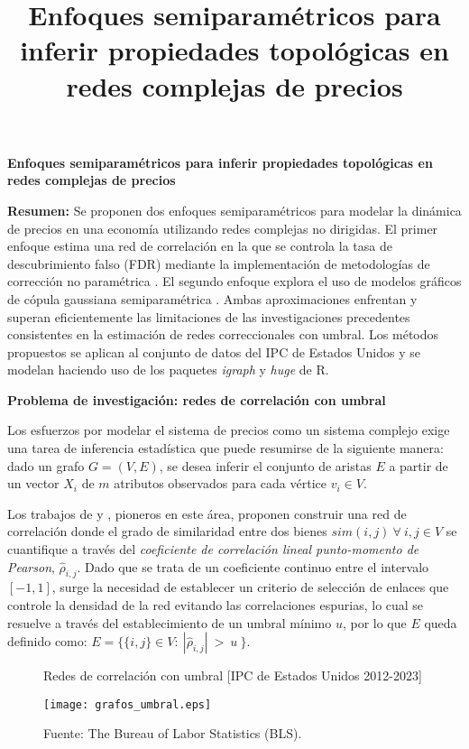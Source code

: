 \documentclass[11pt]{article}
\title{Enfoques semiparamétricos para inferir propiedades topológicas en redes complejas de precios}
\date{}
\begin{document}
\Large \textbf{Enfoques semiparamétricos para inferir propiedades topológicas en redes complejas de precios} \vspace{5mm}

\begin{spacing}{0.9}
{\small \textbf{Resumen:}
	Se proponen dos enfoques semiparamétricos para modelar la dinámica de precios en una economía utilizando redes complejas no dirigidas. El primer enfoque estima una red de correlación en la que se controla la tasa de descubrimiento falso (FDR) mediante la implementación de metodologías de corrección no paramétrica \citep{kolaczyk2014statistical}. El segundo enfoque explora el uso de modelos gráficos de cópula gaussiana semiparamétrica \citep{liu2012high}. Ambas aproximaciones enfrentan y superan eficientemente las limitaciones de las investigaciones precedentes consistentes en la estimación de redes correccionales con umbral. Los métodos propuestos se aplican al conjunto de datos del IPC de Estados Unidos y se modelan haciendo uso de los paquetes \textit{igraph} y \textit{huge} de R.} \vspace{5mm}
\end{spacing}
	
\large \textbf{Problema de investigación: redes de correlación con umbral} 

	Los esfuerzos por modelar el sistema de precios como un sistema complejo exige una tarea de inferencia estadística que puede resumirse de la siguiente manera: dado un grafo $G = (V, E)$, se desea inferir el conjunto de aristas $E$ a partir de un vector $X_{i}$ de $m$ atributos observados para cada vértice $v_{i} \in V$.  
	
	Los trabajos de \citet{gao2013features} y \citet{sarantitis2018network}, pioneros en este área, proponen construir una red de correlación donde el grado de similaridad entre dos bienes $sim(i,j) \ \forall \ i,j \in V$ se cuantifique a través del \textit{coeficiente de correlación lineal punto-momento de Pearson}, $\hat{\rho}_{i,j}$. Dado que se trata de un coeficiente continuo entre el intervalo $[-1, 1]$, surge la necesidad de establecer un criterio de selección de enlaces que controle la densidad de la red evitando las correlaciones espurias, lo cual se resuelve a través del establecimiento de un umbral mínimo $u$, por lo que $E$ queda definido como: $E = \{\{i,j\} \in V: \  |\hat{\rho}_{i,j}| \ >   \ u \ \}$.
	
	\begin{figure}[h!]
		\centering
		\caption{Redes de correlación con umbral [IPC de Estados Unidos 2012-2023]}  %
		\texttt{[image: grafos\_umbral.eps]}
		\captionsetup{justification=justified, singlelinecheck=false}
		\caption*{Fuente: The Bureau of Labor Statistics (BLS).}  %
		\label{fig:GrafosConUmbral}
	\end{figure}
	
\end{document}
